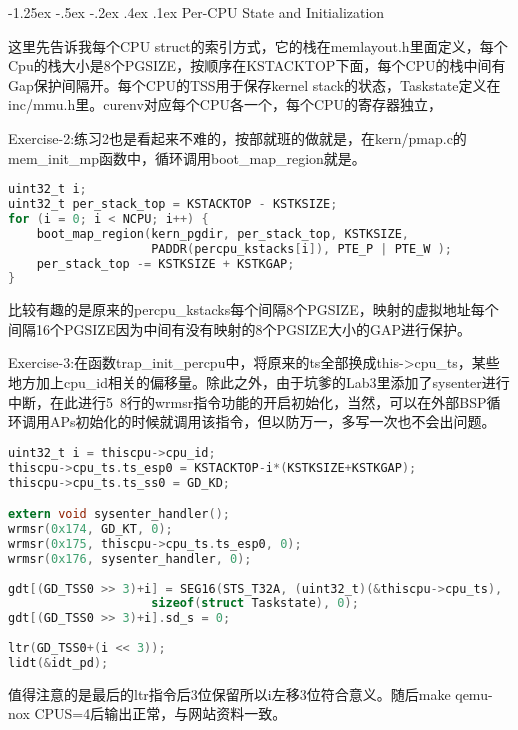 \documentclass[11pt,a4paper]{article}
\makeatletter
\newcommand{\sihao}{\fontsize{14pt}{\baselineskip}\selectfont}
\renewcommand\subsection{\@startsection{subsection}{1}{\z@}%
{-1.25ex \@plus -.5ex \@minus -.2ex}%
{.4ex \@plus .1ex}%
{\normalfont\sihao\fontspec{黑体}}}
\makeatother
\begin{document}
\subsection{Per-CPU State and Initialization}

这里先告诉我每个CPU struct的索引方式，它的栈在memlayout.h里面定义，每个Cpu的栈大小是8个PGSIZE，按顺序在KSTACKTOP下面，每个CPU的栈中间有Gap保护间隔开。每个CPU的TSS用于保存kernel stack的状态，Taskstate定义在inc/mmu.h里。curenv对应每个CPU各一个，每个CPU的寄存器独立，

\color{red}Exercise-2:\color{black}练习2也是看起来不难的，按部就班的做就是，在kern/pmap.c的mem\_init\_mp函数中，循环调用boot\_map\_region就是。

\setmainfont{Consolas}
\begin{lstlisting}[language={C},firstnumber=1,title=kern/pmap.c] 
uint32_t i;
uint32_t per_stack_top = KSTACKTOP - KSTKSIZE;
for (i = 0; i < NCPU; i++) {
	boot_map_region(kern_pgdir, per_stack_top, KSTKSIZE, 
					PADDR(percpu_kstacks[i]), PTE_P | PTE_W );
	per_stack_top -= KSTKSIZE + KSTKGAP;
}
\end{lstlisting}
\setmainfont[BoldFont=黑体]{宋体}

比较有趣的是原来的percpu\_kstacks每个间隔8个PGSIZE，映射的虚拟地址每个间隔16个PGSIZE因为中间有没有映射的8个PGSIZE大小的GAP进行保护。

\color{red}Exercise-3:\color{black}在函数trap\_init\_percpu中，将原来的ts全部换成this->cpu\_ts，某些地方加上cpu\_id相关的偏移量。除此之外，由于坑爹的Lab3里添加了sysenter进行中断，在此进行5~8行的wrmsr指令功能的开启初始化，当然，可以在外部BSP循环调用APs初始化的时候就调用该指令，但以防万一，多写一次也不会出问题。

\setmainfont{Consolas}
\begin{lstlisting}[language={C},firstnumber=1,title=kern/trap.c] 
uint32_t i = thiscpu->cpu_id;
thiscpu->cpu_ts.ts_esp0 = KSTACKTOP-i*(KSTKSIZE+KSTKGAP);
thiscpu->cpu_ts.ts_ss0 = GD_KD;

extern void sysenter_handler();
wrmsr(0x174, GD_KT, 0);
wrmsr(0x175, thiscpu->cpu_ts.ts_esp0, 0);
wrmsr(0x176, sysenter_handler, 0);
	
gdt[(GD_TSS0 >> 3)+i] = SEG16(STS_T32A, (uint32_t)(&thiscpu->cpu_ts),
					sizeof(struct Taskstate), 0);
gdt[(GD_TSS0 >> 3)+i].sd_s = 0;
	
ltr(GD_TSS0+(i << 3));
lidt(&idt_pd);
\end{lstlisting}
\setmainfont[BoldFont=黑体]{宋体}

值得注意的是最后的ltr指令后3位保留所以i左移3位符合意义。随后make qemu-nox CPUS=4后输出正常，与网站资料一致。
\end{document}
